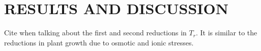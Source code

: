 \section*{RESULTS AND DISCUSSION}

Cite \citep{carillo} when talking about the first and second reductions in $T_r$.
It is similar to the reductions in plant growth due to osmotic and ionic stresses.
